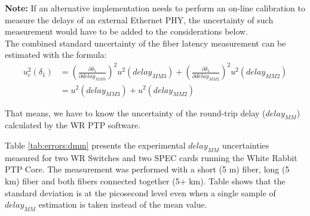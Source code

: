 {\bf Note:} If an alternative implementation needs to perform an on-line
calibration to measure the delays of an external Ethernet PHY, the uncertainty
of such measurement would have to be added to the considerations below.\\

The combined standard uncertainty of the fiber latency measurement can be estimated
with the formula:
\begin{align}
	\label{equ:errors:filat}
	u_c^2(\delta_1) &= \left( \frac{\partial \delta_1}{\partial delay_{MM3}} \right)^2 u^2(delay_{MM3}) + \left( \frac{\partial \delta_1}{\partial delay_{MM2}} \right)^2 u^2(delay_{MM2}) \nonumber \\
	&= u^2(delay_{MM3}) + u^2(delay_{MM2})
\end{align}

\noindent That means, we have to know the uncertainty of the round-trip delay
($delay_{MM}$) calculated by the WR PTP software.
\renewcommand{\arraystretch}{1.2}
\begin{table}[ht]
	\begin{center}
	\caption{Experimental uncertainties of $delay_{MM}$ for various WR Devices based on N=100 observations made in 1s intervals}
	\label{tab:errors:dmm}
	\end{center}
\end{table}
\renewcommand{\arraystretch}{1}
Table \ref{tab:errors:dmm} presents the experimental $delay_{MM}$ uncertainties
measured for two WR Switches and two SPEC cards running the White Rabbit PTP
Core. The measurement was performed with a short (5 m) fiber, long (5 km)
fiber and both fibers connected together (5+ km). Table shows that the standard
deviation is at the picosecond level even when a single sample of $delay_{MM}$
estimation is taken instead of the mean value.\\


